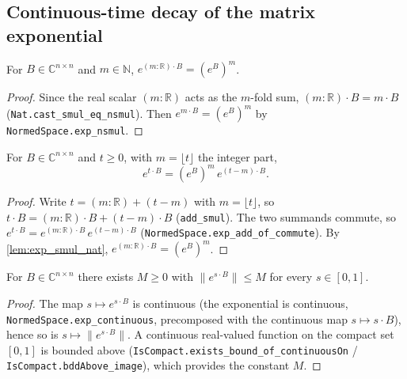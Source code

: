 \subsection{Continuous-time decay of the matrix exponential}

\begin{lemma}
    \label{lem:exp_smul_nat}
    \leanok
    For $B \in \mathbb{C}^{n \times n}$ and $m \in \mathbb{N}$,
    $e^{(m : \mathbb{R}) \cdot B} = (e^{B})^{m}$.
\end{lemma}
\begin{proof}
    Since the real scalar $(m : \mathbb{R})$ acts as the $m$-fold sum,
    $(m : \mathbb{R}) \cdot B = m \cdot B$ (\texttt{Nat.cast\_smul\_eq\_nsmul}).
    Then $e^{m \cdot B} = (e^{B})^{m}$ by \texttt{NormedSpace.exp\_nsmul}.
\end{proof}

\begin{lemma}
    \label{lem:exp_smul_split}
    \leanok
    For $B \in \mathbb{C}^{n \times n}$ and $t \ge 0$, with $m = \lfloor t
    \rfloor$ the integer part,
    \[ e^{t \cdot B} = (e^{B})^{m} \, e^{(t - m) \cdot B}. \]
\end{lemma}
\begin{proof}
    Write $t = (m : \mathbb{R}) + (t - m)$ with $m = \lfloor t \rfloor$, so
    $t \cdot B = (m : \mathbb{R}) \cdot B + (t - m) \cdot B$ (\texttt{add\_smul}).
    The two summands commute, so $e^{t \cdot B} = e^{(m : \mathbb{R}) \cdot B}\,
    e^{(t - m) \cdot B}$ (\texttt{NormedSpace.exp\_add\_of\_commute}). By
    \cref{lem:exp_smul_nat}, $e^{(m : \mathbb{R}) \cdot B} = (e^{B})^{m}$.
\end{proof}

\begin{lemma}
    \label{lem:bddAbove_exp_smul_unit}
    \leanok
    For $B \in \mathbb{C}^{n \times n}$ there exists $M \ge 0$ with
    $\|e^{s \cdot B}\| \le M$ for every $s \in [0,1]$.
\end{lemma}
\begin{proof}
    The map $s \mapsto e^{s \cdot B}$ is continuous (the exponential is
    continuous, \texttt{NormedSpace.exp\_continuous}, precomposed with the
    continuous map $s \mapsto s \cdot B$), hence so is $s \mapsto \|e^{s \cdot
    B}\|$. A continuous real-valued function on the compact set $[0,1]$ is
    bounded above (\texttt{IsCompact.exists\_bound\_of\_continuousOn} /
    \texttt{IsCompact.bddAbove\_image}), which provides the constant $M$.
\end{proof}

